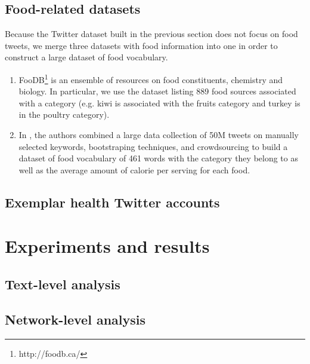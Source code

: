 \documentclass[letterpaper]{article}
\newcommand{\cut}[1]{}
\begin{document}
\subsection{Food-related datasets}

Because the Twitter dataset built in the previous section does not focus on food tweets, we merge three datasets with food information into one in order to construct a large dataset of food vocabulary.

\begin{enumerate}

  \item FooDB\footnote{http://foodb.ca/} is an ensemble of resources on food
  constituents, chemistry and biology. In particular, we use the dataset listing
  889 food sources associated with a category (e.g. kiwi is associated with the
  fruits category and turkey is in the poultry category).

  \item In \cite{abbar2015you}, the authors combined a large data collection of
  50M tweets on manually selected keywords, bootstraping techniques, and
  crowdsourcing to build a dataset of food vocabulary of 461 words with the
  category they belong to as well as the average amount of calorie per serving
  for each food.

\end{enumerate}

\cut{
  - foodb: http://foodb.ca/
  - wordnet: miller1995wordnet
  - you tweet what you eat
}

\subsection{Exemplar health Twitter accounts}

\section{Experiments and results}

\subsection{Text-level analysis}

\cut {
  - most predictive features
  - most used categories
}

\subsection{Network-level analysis}






\end{document}
